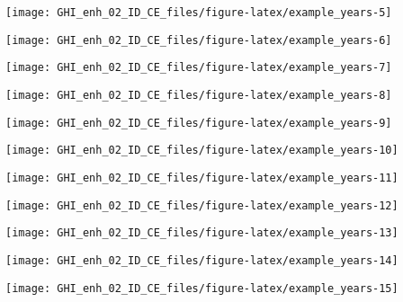 \documentclass[
  10pt,
  a4paper,oneside]{article}
\begin{document}
\begin{center}\texttt{[image: GHI\_enh\_02\_ID\_CE\_files/figure-latex/example\_years-5]} \end{center}

\begin{center}\texttt{[image: GHI\_enh\_02\_ID\_CE\_files/figure-latex/example\_years-6]} \end{center}

\begin{center}\texttt{[image: GHI\_enh\_02\_ID\_CE\_files/figure-latex/example\_years-7]} \end{center}

\begin{center}\texttt{[image: GHI\_enh\_02\_ID\_CE\_files/figure-latex/example\_years-8]} \end{center}

\begin{center}\texttt{[image: GHI\_enh\_02\_ID\_CE\_files/figure-latex/example\_years-9]} \end{center}

\begin{center}\texttt{[image: GHI\_enh\_02\_ID\_CE\_files/figure-latex/example\_years-10]} \end{center}

\begin{center}\texttt{[image: GHI\_enh\_02\_ID\_CE\_files/figure-latex/example\_years-11]} \end{center}

\begin{center}\texttt{[image: GHI\_enh\_02\_ID\_CE\_files/figure-latex/example\_years-12]} \end{center}

\begin{center}\texttt{[image: GHI\_enh\_02\_ID\_CE\_files/figure-latex/example\_years-13]} \end{center}

\begin{center}\texttt{[image: GHI\_enh\_02\_ID\_CE\_files/figure-latex/example\_years-14]} \end{center}

\begin{center}\texttt{[image: GHI\_enh\_02\_ID\_CE\_files/figure-latex/example\_years-15]} \end{center}
\end{document}
